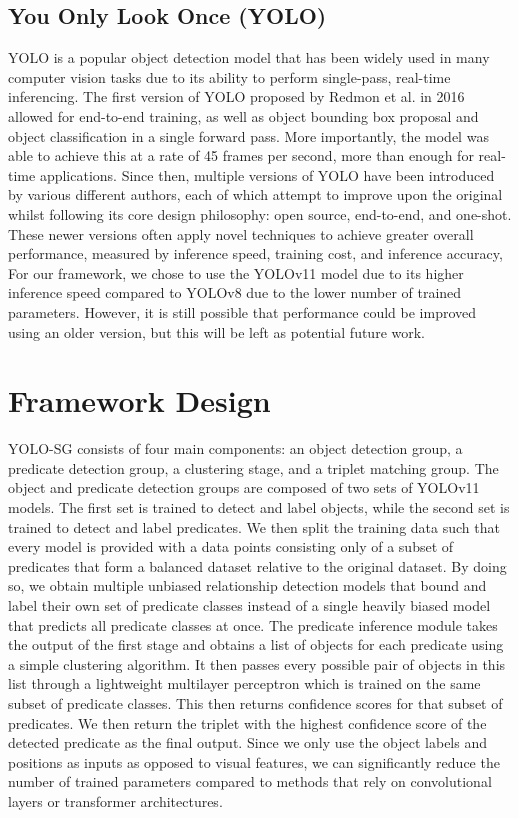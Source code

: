 \documentclass{article}
\begin{document}
\subsection*{You Only Look Once (YOLO)}
YOLO is a popular object detection model that has been widely used in many computer vision tasks due to its ability to perform single-pass, real-time inferencing. The first version of YOLO proposed by Redmon et al. in 2016 allowed for end-to-end training, as well as object bounding box proposal and object classification in a single forward pass\cite{redmon2016you}.
More importantly, the model was able to achieve this at a rate of 45 frames per second, more than enough for real-time applications. Since then, multiple versions of YOLO have been introduced by various different authors, each of which attempt to improve upon the original whilst following its core design philosophy: open source, end-to-end, and one-shot\cite{terven2023comprehensive}. These newer versions often apply novel techniques to achieve greater overall performance, measured by inference speed, training cost, and inference accuracy\cite{terven2023comprehensive,redmon2017yolo9000,sohan2024review}, 
For our framework, we chose to use the YOLOv11 model due to its higher inference speed compared to YOLOv8 due to the lower number of trained parameters\cite{ultralytics11}. However, it is still possible that performance could be improved using an older version, but this will be left as potential future work.

\section{Framework Design}
 YOLO-SG consists of four main components: an object detection group, a predicate detection group, a clustering stage, and a triplet matching group. The object and predicate detection groups are composed of two sets of YOLOv11 models\cite{redmon2016you}. 
The first set is trained to detect and label objects, while the second set is trained to detect and label predicates. We then split the training data such that every model is provided with a data points consisting only of a subset of predicates that form a balanced dataset relative to the original dataset. By doing so, we obtain multiple unbiased relationship detection models that bound and label their own set of predicate classes instead of a single heavily biased model that predicts all predicate classes at once.
The predicate inference module takes the output of the first stage and obtains a list of objects for each predicate using a simple clustering algorithm.
It then passes every possible pair of objects in this list through a lightweight multilayer perceptron which is trained on the same subset of predicate classes. This then returns confidence scores for that subset of predicates. We then return the triplet with the highest confidence score of the detected predicate as the final output. Since we only use the object labels and positions as inputs as opposed to visual features, we can significantly reduce the number of trained parameters compared to methods that rely on convolutional layers or transformer architectures. 
\end{document}
